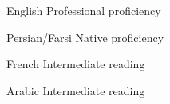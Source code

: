 
\begin{cvskills}

  \cvskill
    {English} %
    {Professional proficiency} %

  \cvskill
    {Persian/Farsi} %
    {Native proficiency} %
    
  \cvskill
    {French} %
    {Intermediate reading} %

 \cvskill
    {Arabic} %
    {Intermediate reading} %

\end{cvskills}
